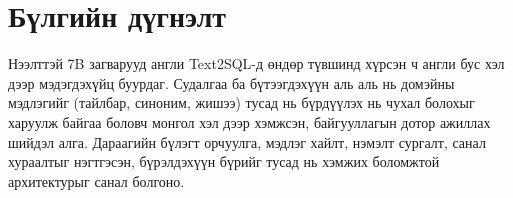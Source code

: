 \section{Бүлгийн дүгнэлт}
\label{sec:ch2-summary}

Нээлттэй 7B загварууд англи Text2SQL-д өндөр түвшинд хүрсэн ч англи бус хэл дээр мэдэгдэхүйц буурдаг. Судалгаа ба
бүтээгдэхүүн аль аль нь домэйны мэдлэгийг (тайлбар, синоним, жишээ) тусад нь бүрдүүлэх нь чухал болохыг харуулж байгаа
боловч монгол хэл дээр хэмжсэн, байгууллагын дотор ажиллах шийдэл алга. Дараагийн бүлэгт орчуулга, мэдлэг хайлт, нэмэлт
сургалт, санал хураалтыг нэгтгэсэн, бүрэлдэхүүн бүрийг тусад нь хэмжих боломжтой архитектурыг санал болгоно.
